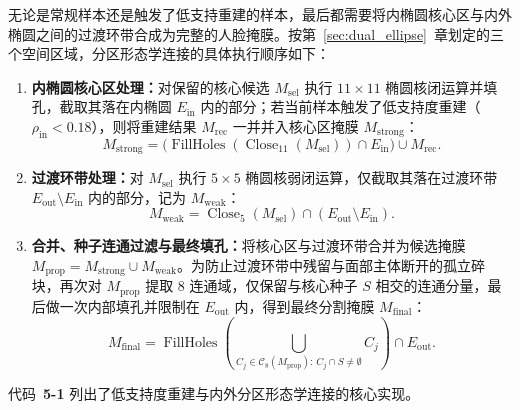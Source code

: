 无论是常规样本还是触发了低支持重建的样本，最后都需要将内椭圆核心区与内外椭圆之间的过渡环带合成为完整的人脸掩膜。按第~\ref{sec:dual_ellipse}~章划定的三个空间区域，分区形态学连接的具体执行顺序如下：
\begin{enumerate}
\item \textbf{内椭圆核心区处理：}对保留的核心候选 $M_{\text{sel}}$ 执行 $11\times11$ 椭圆核闭运算并填孔，截取其落在内椭圆 $E_{\text{in}}$ 内的部分；若当前样本触发了低支持度重建（$\rho_{\text{in}}<0.18$），则将重建结果 $M_{\text{rec}}$ 一并并入核心区掩膜 $M_{\text{strong}}$：
\begin{equation}
M_{\text{strong}} = \bigl(\operatorname{FillHoles}(\operatorname{Close}_{11}(M_{\text{sel}}))\cap E_{\text{in}}\bigr) \cup M_{\text{rec}}.
\label{eq:mstrong}
\end{equation}
\item \textbf{过渡环带处理：}对 $M_{\text{sel}}$ 执行 $5\times5$ 椭圆核弱闭运算，仅截取其落在过渡环带 $E_{\text{out}}\setminus E_{\text{in}}$ 内的部分，记为 $M_{\text{weak}}$：
\begin{equation}
M_{\text{weak}} = \operatorname{Close}_{5}(M_{\text{sel}})\cap (E_{\text{out}}\setminus E_{\text{in}}).
\label{eq:mweak}
\end{equation}
\item \textbf{合并、种子连通过滤与最终填孔：}将核心区与过渡环带合并为候选掩膜 $M_{\text{prop}} = M_{\text{strong}} \cup M_{\text{weak}}$。为防止过渡环带中残留与面部主体断开的孤立碎块，再次对 $M_{\text{prop}}$ 提取 8 连通域，仅保留与核心种子 $S$ 相交的连通分量，最后做一次内部填孔并限制在 $E_{\text{out}}$ 内，得到最终分割掩膜 $M_{\text{final}}$：
\begin{equation}
M_{\text{final}} = \operatorname{FillHoles}\!\left(\bigcup_{C_j\in\mathcal{C}_8(M_{\text{prop}}):\,C_j\cap S\neq\emptyset} C_j\right)\cap E_{\text{out}}.
\label{eq:zonalmorph}
\end{equation}
\end{enumerate}

代码~\textbf{5-1} 列出了低支持度重建与内外分区形态学连接的核心实现。

